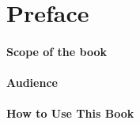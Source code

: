 \chapter*{Preface}

\subsubsection*{Scope of the book}

\subsubsection*{Audience}

\subsubsection*{How to Use This Book}
